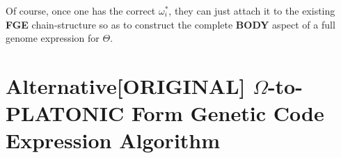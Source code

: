 \documentclass[a4paper, 18pt]{book} %
\begin{document}
\begin{appendices}
\begin{enumerate}
{
}
\end{enumerate}

Of course, once one has the correct $\boxed{\omega_i^*}$, they can just attach it to the existing \textbf{FGE} chain-structure so as to construct the  complete \textbf{BODY} aspect of a full genome expression for $\Theta$.




\chapter{Alternative[ORIGINAL] $\Omega$-to-PLATONIC Form Genetic Code Expression Algorithm}
\label{SECALTPFGESA}


\end{appendices}
\end{document}
